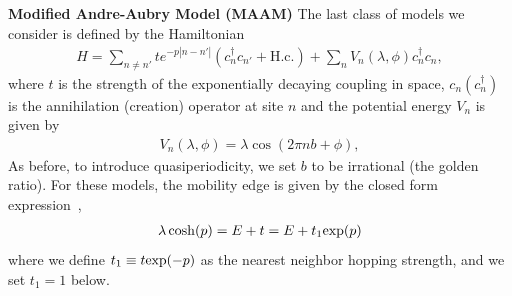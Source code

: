 \documentclass{article}
\numberwithin{equation}{section}
\numberwithin{figure}{section}
\begin{document}
{\bf Modified Andre-Aubry Model (MAAM)} The last class of models we consider is defined by the Hamiltonian~\cite{ME_biddle2010predicted}
\begin{align}
    H = \sum_{n\ne n'} te^{-p|n-n'|}\left( c^\dag_{n} c_{n'} + \text{H.c.}\right) + \sum_n V_n(\lambda, \phi) c^\dag_n c_n,
\end{align}
where $t$ is the strength of the exponentially decaying coupling in space, $c_n (c^\dag_n)$ is the annihilation (creation) operator at site $n$ and the potential energy $V_n$ is given by
\begin{align}
    V_n(\lambda, \phi) = \lambda \cos(2\pi n b + \phi),
\end{align}
As before, to introduce quasiperiodicity, we set $b$ to be irrational (the golden ratio). For these models, the mobility edge is given by the closed form expression~\cite{ME_biddle2010predicted},
\begin{align}\label{eq:maam-me}
    \lambda \cosh(p) = E + t = E + t_1{\rm exp}(p)
\end{align}
where we define $t_1\equiv t{\rm exp}(-p)$ as the nearest neighbor hopping strength, and we set $t_1=1$ below. 
\end{document}
